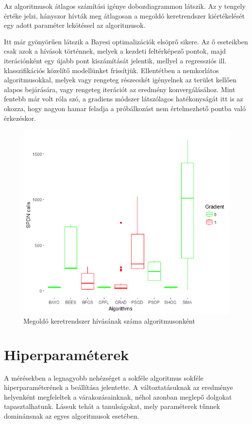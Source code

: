 Az algoritmusok átlagos számítási igénye  dobozdiagrammon látszik. Az y tengely értéke jelzi, hányszor hívták meg átlagosan a megoldó keretrendszer kiértékelését egy adott paraméter lekötéssel az algoritmusok.

Itt már gyönyörűen látszik a Bayesi optimalizációk elsöprő sikere. Az ő eseteikben csak azok a hívások történnek, melyek a kezdeti feltérképező pontok, majd iterációnként egy újabb pont kiszámítását jelentik, mellyel a regressziós ill. klasszifikációs közelítő modellünket frissítjük. Ellentétben a nemkorlátos algoritmusokkal, melyek vagy rengeteg részecskét igényelnek az terület kellően alapos bejárására, vagy rengeteg iterációt az eredmény konvergálásához. Mint fentebb már volt róla szó, a gradiens módszer látszólagos hatékonyságát itt is az okozza, hogy nagyon hamar feladja a próbálkozást nem értelmezhető pontba való érkezéskor.

\begin{figure}
	\centering
	\includegraphics[width=140mm, keepaspectratio]{figures/func_calcs_boxplot.png}
	\caption{Megoldó keretrendszer hívásának száma algoritmusonként}
	\label{fig:funccalc}
\end{figure}

\section{Hiperparaméterek}
A mérésekben a legnagyobb nehézséget a sokféle algoritmus sokféle hiperparaméterének a beállítása jelentette. A változtatásuknak az eredménye helyenként megfeleltek a várakozásainknak, néhol azonban meglepő dolgokat tapasztalhatunk. Lássuk tehát a tanulságokat, mely paraméterek tűnnek dominánsnak az egyes algoritmusok esetében.
